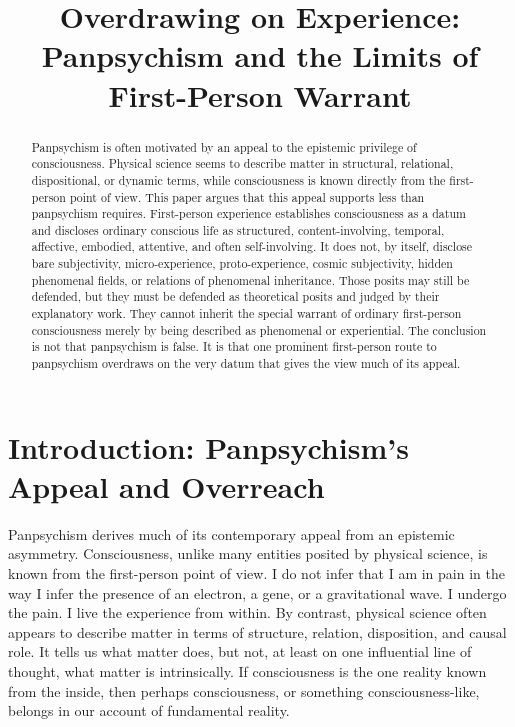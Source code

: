 \documentclass[12pt]{article}
\title{Overdrawing on Experience: Panpsychism and the Limits of First-Person Warrant}
\author{}
\date{}
\begin{document}
\maketitle
\doublespacing

\begin{abstract}
Panpsychism is often motivated by an appeal to the epistemic privilege of consciousness. Physical science seems to describe matter in structural, relational, dispositional, or dynamic terms, while consciousness is known directly from the first-person point of view. This paper argues that this appeal supports less than panpsychism requires. First-person experience establishes consciousness as a datum and discloses ordinary conscious life as structured, content-involving, temporal, affective, embodied, attentive, and often self-involving. It does not, by itself, disclose bare subjectivity, micro-experience, proto-experience, cosmic subjectivity, hidden phenomenal fields, or relations of phenomenal inheritance. Those posits may still be defended, but they must be defended as theoretical posits and judged by their explanatory work. They cannot inherit the special warrant of ordinary first-person consciousness merely by being described as phenomenal or experiential. The conclusion is not that panpsychism is false. It is that one prominent first-person route to panpsychism overdraws on the very datum that gives the view much of its appeal.
\end{abstract}

\section{Introduction: Panpsychism's Appeal and Overreach}

Panpsychism derives much of its contemporary appeal from an epistemic asymmetry. Consciousness, unlike many entities posited by physical science, is known from the first-person point of view. I do not infer that I am in pain in the way I infer the presence of an electron, a gene, or a gravitational wave. I undergo the pain. I live the experience from within. By contrast, physical science often appears to describe matter in terms of structure, relation, disposition, and causal role. It tells us what matter does, but not, at least on one influential line of thought, what matter is intrinsically. If consciousness is the one reality known from the inside, then perhaps consciousness, or something consciousness-like, belongs in our account of fundamental reality.
\end{document}
